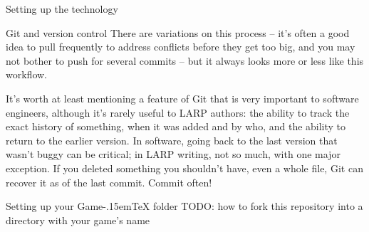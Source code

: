 \documentclass[11pt,  total={6in, 8in}]{article}
\def\gametex{\mbox{Game\kern-.15em\TeX}}
\begin{document}
\begin{section}{Setting up the technology}
\begin{subsection}{Git and version control}
There are variations on this process -- it's often a good idea to pull frequently to address conflicts before they get too big, and you may not bother to push for several commits -- but it always looks more or less like this workflow.

It's worth at least mentioning a feature of Git that is very important to software engineers, although it's rarely useful to LARP authors: the ability to track the exact history of something, when it was added and by who, and the ability to return to the earlier version.  In software, going back to the last version that wasn't buggy can be critical; in LARP writing, not so much, with one major exception.  If you deleted something you shouldn't have, even a whole file, Git can recover it as of the last commit.  Commit often!
\end{subsection}
\begin{subsection}{Setting up your \gametex{} folder}
TODO: how to fork this repository into a directory with your game's name
\end{subsection}
\end{section}
\end{document}
